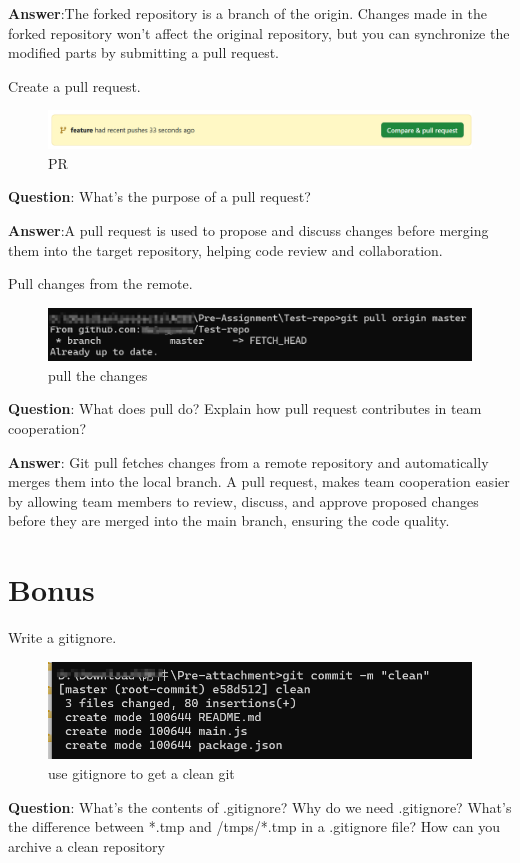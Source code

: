 \documentclass{article}
\begin{document}
\textbf{Answer}:The forked repository is a branch of the origin. Changes made in the forked repository won't affect the original repository, but you can synchronize the modified parts by submitting a pull request.

Create a pull request.
\begin{figure}[H]
\centering
\includegraphics[width = \textwidth]{../figures/PR2.png}
\caption{PR}
\end{figure}
\textbf{Question}: What's the purpose of a pull request?

\textbf{Answer}:A pull request is used to propose and discuss changes before merging them into the target repository, helping code review and collaboration.

Pull changes from the remote.
\begin{figure}[H]
\centering
\includegraphics[width = \textwidth]{../figures/pull.png}
\caption{pull the changes}
\end{figure}
\textbf{Question}: What does pull do? Explain how pull request contributes in team cooperation?

\textbf{Answer}: Git pull fetches changes from a remote repository and automatically merges them into the local branch.
A pull request, makes team cooperation easier by allowing team members to review, discuss, and approve proposed changes before they are merged into the main branch,
ensuring the code quality.

\section{Bonus}
Write a gitignore.
\begin{figure}[H]
\centering
\includegraphics[width = \textwidth]{../figures/clean.png}
\caption{use gitignore to get a clean git}
\end{figure}
\textbf{Question}: What's the contents of .gitignore? Why do we need .gitignore? What's the
difference between *.tmp and /tmps/*.tmp in a .gitignore file? How can you archive a clean
repository
\end{document}
